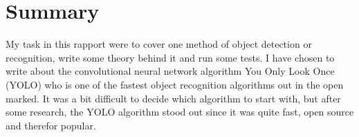\newpage
\section*{Summary}
My task in this rapport were to cover one method of object detection or recognition, write some theory behind it and run some tests. I have chosen to write about the convolutional neural network algorithm You Only Look Once (YOLO) who is one of the fastest object recognition algorithms out in the open marked. It was a bit difficult to decide which algorithm to start with, but after some research, the YOLO algorithm stood out since it was quite fast, open source and therefor popular. 

